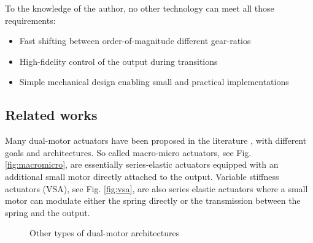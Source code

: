 To the knowledge of the author, no other technology can meet all those requirements:
\begin{itemize}
	\item Fast shifting between order-of-magnitude different gear-ratios
	\item High-fidelity control of the output during transitions
	\item Simple mechanical design enabling small and practical implementations
\end{itemize}

\subsection{Related works}
Many dual-motor actuators have been proposed in the literature \cite{tagliamonte_double_2012}, with different goals and architectures. So called macro-micro actuators, see Fig. \ref{fig:macromicro}, are essentially series-elastic actuators equipped with an additional small motor directly attached to the output. Variable stiffness actuators (VSA), see Fig. \ref{fig:vsa}, are also series elastic actuators where a small motor can modulate either the spring directly or the transmission between the spring and the output.
%
\begin{figure}[htp]
        \centering
        \caption{Other types of dual-motor architectures}\label{fig:dualmotoractuators}
\end{figure}
%
